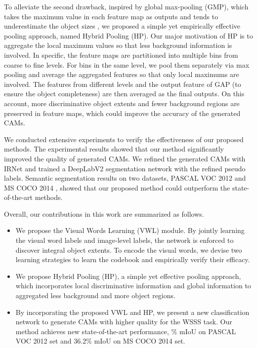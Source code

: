 \par To alleviate the second drawback, inspired by global max-pooling (GMP), which takes the maximum value in each feature map as outputs and tends to underestimate the object sizes \citep{kolesnikov2016seed}, we proposed a simple yet empirically effective pooling approach, named Hybrid Pooling (HP). Our major motivation of HP is to aggregate the local maximum values so that less background information is involved. In specific, the feature maps are partitioned into multiple bins from coarse to fine levels. For bins in the same level, we pool them separately via max pooling and average the aggregated features so that only local maximums are involved. The features from different levels and the output feature of GAP (to ensure the object completeness) are then averaged as the final outputs. On this account, more discriminative object extents and fewer background regions are preserved in feature maps, which could improve the accuracy of the generated CAMs.

\par We conducted extensive experiments to verify the effectiveness of our proposed methods. The experimental results showed that our method significantly improved the quality of generated CAMs. We refined the generated CAMs with IRNet \citep{ahn2019weakly} and trained a DeepLabV2 segmentation network \citep{chen2017deeplab} with the refined pseudo labels. Semantic segmentation results on two datasets, PASCAL VOC 2012 \citep{everingham2010pascal} and MS COCO 2014 \citep{lin2014microsoft}, showed that our proposed method could outperform the state-of-the-art methods.
\par Overall, our contributions in this work are summarized as follows.
\begin{itemize}
  \item We propose the Visual Words Learning (VWL) module. By jointly learning the visual word labels and image-level labels, the network is enforced to discover integral object extents. To encode the visual words, we devise two learning strategies to learn the codebook and empirically verify their efficacy.
  \item We propose Hybrid Pooling (HP), a simple yet effective pooling approach, which incorporates local discriminative information and global information to aggregated less background and more object regions.
  \item By incorporating the proposed VWL and HP, we present a new classification network to generate CAMs with higher quality for the WSSS task. Our method achieves new state-of-the-art performance, \% mIoU on PASCAL VOC 2012  set and 36.2\% mIoU on MS COCO 2014  set.
\end{itemize}


